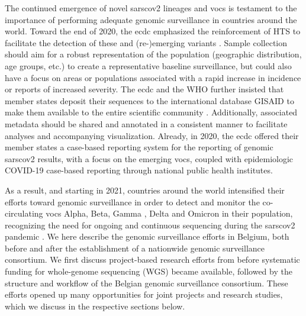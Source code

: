 The continued emergence of novel \gls{sarscov2} lineages and \gls{voc}s is testament to the importance of performing adequate genomic surveillance in countries around the world.
Toward the end of 2020, the \gls{ecdc} emphasized the reinforcement of HTS to facilitate the detection of these and (re-)emerging variants \citep{ecdcSequencing}.
Sample collection should aim for a robust representation of the population (geographic distribution, age groups, etc.) to create a representative baseline surveillance, but could also have a focus on areas or populations associated with a rapid increase in incidence or reports of increased severity.
The \gls{ecdc} and the WHO further insisted that member states deposit their sequences to the international database GISAID \citep{shu2017gisaid} to make them available to the entire scientific community \citep{ecdcSequencing}.
Additionally, associated metadata should be shared and annotated in a consistent manner to facilitate analyses and accompanying visualization.
Already, in 2020, the \gls{ecdc} offered their member states a case-based reporting system for the reporting of genomic \gls{sarscov2} results, with a focus on the emerging \gls{voc}s, coupled with epidemiologic COVID-19 case-based reporting through national public health institutes.

As a result, and starting in 2021, countries around the world intensified their efforts toward genomic surveillance in order to detect and monitor the co-circulating \gls{voc}s Alpha, Beta, Gamma \citep{greaney2021comprehensive}, Delta and Omicron in their population, recognizing the need for ongoing and continuous sequencing during the \gls{sarscov2} pandemic \citep{martin2021insights}.
We here describe the genomic surveillance efforts in Belgium, both before and after the establishment of a nationwide genomic surveillance consortium.
We first discuss project-based research efforts from before systematic funding for whole-genome sequencing (WGS) became available, followed by the structure and workflow of the Belgian genomic surveillance consortium.
These efforts opened up many opportunities for joint projects and research studies, which we discuss in the respective sections below.


